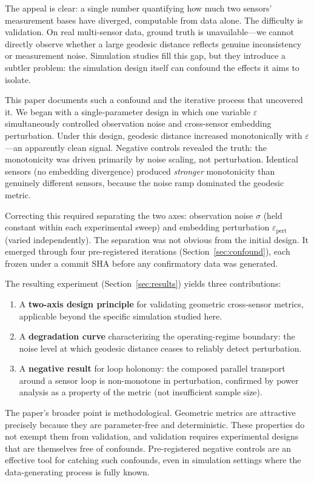 \documentclass[11pt]{article}
\newcommand{\eps}{\varepsilon}
\newcommand{\epspert}{\eps_\mathrm{pert}}
\begin{document}
The appeal is clear: a single number quantifying how much two
sensors' measurement bases have diverged, computable from data
alone.  The difficulty is validation.  On real multi-sensor data,
ground truth is unavailable---we cannot directly observe whether a
large geodesic distance reflects genuine inconsistency or
measurement noise.  Simulation studies fill this gap, but they
introduce a subtler problem: the simulation design itself can
confound the effects it aims to isolate.

This paper documents such a confound and the iterative process that
uncovered it.  We began with a single-parameter design in which one
variable $\eps$ simultaneously controlled observation noise and
cross-sensor embedding perturbation.  Under this design, geodesic
distance increased monotonically with $\eps$---an apparently clean
signal.  Negative controls revealed the truth: the monotonicity was
driven primarily by noise scaling, not perturbation.  Identical
sensors (no embedding divergence) produced \emph{stronger}
monotonicity than genuinely different sensors, because the noise
ramp dominated the geodesic metric.

Correcting this required separating the two axes: observation noise
$\sigma$ (held constant within each experimental sweep) and
embedding perturbation $\epspert$ (varied independently).  The
separation was not obvious from the initial design.  It emerged
through four pre-registered iterations (Section~\ref{sec:confound}),
each frozen under a commit SHA before any confirmatory data was
generated.

The resulting experiment (Section~\ref{sec:results}) yields three
contributions:

\begin{enumerate}
  \item A \textbf{two-axis design principle} for validating
    geometric cross-sensor metrics, applicable beyond the specific
    simulation studied here.
  \item A \textbf{degradation curve} characterizing the
    operating-regime boundary: the noise level at which geodesic
    distance ceases to reliably detect perturbation.
  \item A \textbf{negative result} for loop holonomy: the composed
    parallel transport around a sensor loop is non-monotone in
    perturbation, confirmed by power analysis as a property of the
    metric (not insufficient sample size).
\end{enumerate}

The paper's broader point is methodological.  Geometric metrics are
attractive precisely because they are parameter-free and
deterministic.  These properties do not exempt them from validation,
and validation requires experimental designs that are themselves
free of confounds.  Pre-registered negative controls are an
effective tool for catching such confounds, even in simulation
settings where the data-generating process is fully known.
\end{document}
